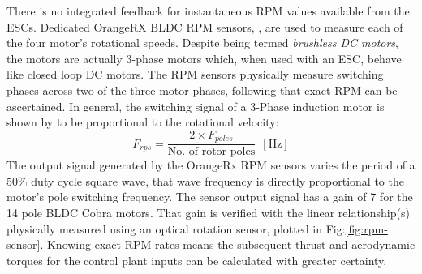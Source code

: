\par
There is no integrated feedback for instantaneous RPM values available from the ESCs. Dedicated OrangeRX BLDC RPM sensors, \cite{orangerpm}, are used to measure each of the four motor's rotational speeds. Despite being termed \emph{brushless DC motors}, the motors are actually 3-phase motors which, when used with an ESC, behave like closed loop DC motors. The RPM sensors physically measure switching phases across two of the three motor phases, following that exact RPM can be ascertained. In general, the switching signal of a 3-Phase induction motor is shown by \cite{vfd} to be proportional to the rotational velocity:
\begin{equation}
F_{rps}=\frac{2\times F_{poles}}{\text{No. of rotor poles}}~~[\text{Hz}]
\end{equation}
The output signal generated by the OrangeRx RPM sensors varies the period of a 50\% duty cycle square wave, that wave frequency is directly proportional to the motor's pole switching frequency. The sensor output signal has a gain of 7 for the 14 pole BLDC Cobra motors. That gain is verified with the linear relationship(s) physically measured using an optical rotation sensor, plotted in Fig:\ref{fig:rpm-sensor}. Knowing exact RPM rates means the subsequent thrust and aerodynamic torques for the control plant inputs can be calculated with greater certainty.
\par
